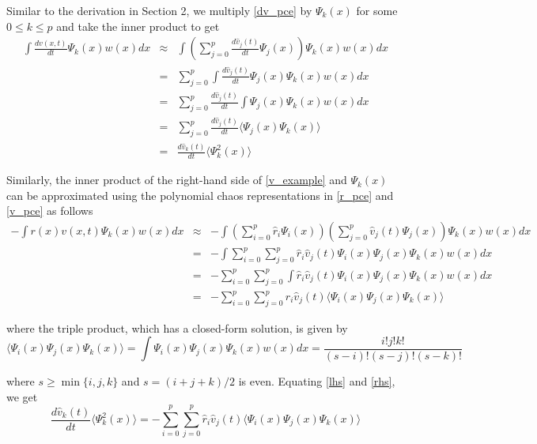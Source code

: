\documentclass[11pt]{article}
\numberwithin{equation}{section}
\begin{document}
Similar to the derivation in Section 2, we multiply \eqref{dv_pce} by $\Psi_k(x)$ for some $0 \leq k \leq  p$ and take the inner product to get
\begin{eqnarray}
\int \frac{dv(x, t)}{dt} \Psi_k(x) w(x) dx & \approx & \int \left( \sum_{j=0}^p \frac{d\hat{v}_j(t)}{dt} \Psi_j(x) \right) \Psi_k(x) w(x) dx  \nonumber \\
& = & \sum_{j=0}^p \int \frac{d\hat{v}_j(t)}{dt} \Psi_j(x) \Psi_k(x) w(x) dx \nonumber \\
& = & \sum_{j=0}^p \frac{d\hat{v}_j(t)}{dt} \int \Psi_j(x) \Psi_k(x) w(x) dx \nonumber \\
& = & \sum_{j=0}^p \frac{d\hat{v}_j(t)}{dt} \langle \Psi_j(x) \Psi_k(x) \rangle \nonumber \\
& = & \frac{d\hat{v}_k(t)}{dt} \langle \Psi_k^2(x) \rangle \label{lhs}
\end{eqnarray}

Similarly, the inner product of the right-hand side of \eqref{v_example} and $\Psi_k(x)$ can be approximated using the polynomial chaos representations in \eqref{r_pce} and \eqref{v_pce} as follows
\begin{eqnarray}
 - \int r(x) v(x, t) \Psi_k(x) w(x) dx & \approx & - \int \left( \sum_{i=0}^p \hat{r}_i \Psi_i(x) \right) \left( \sum_{j=0}^p \hat{v}_j(t) \Psi_j(x) \right) \Psi_k(x) w(x) dx \nonumber \\
& = & - \int \sum_{i=0}^p \sum_{j=0}^p \hat{r}_i \hat{v}_j(t) \Psi_i(x) \Psi_j(x) \Psi_k(x) w(x) dx \nonumber \\
& = & - \sum_{i=0}^p \sum_{j=0}^p \int \hat{r}_i \hat{v}_j(t) \Psi_i(x) \Psi_j(x) \Psi_k(x) w(x) dx \nonumber \\
& = & - \sum_{i=0}^p \sum_{j=0}^p \hat{r}_i \hat{v}_j(t) \langle \Psi_i(x) \Psi_j(x) \Psi_k(x) \rangle \label{rhs}
\end{eqnarray}

where the triple product, which has a closed-form solution, is given by
\begin{equation}
\langle \Psi_i(x) \Psi_j(x) \Psi_k(x) \rangle = \int \Psi_i(x) \Psi_j(x) \Psi_k(x) w(x) dx = \frac{i! j! k!}{(s-i)! (s-j)! (s-k)!}
\end{equation}
 
where $s \geq \min\{i, j, k\}$ and $s = (i + j + k)/2$ is even. Equating \eqref{lhs} and \eqref{rhs}, we get 
\begin{equation*}
\frac{d\hat{v}_k(t)}{dt} \langle \Psi_k^2(x) \rangle = - \sum_{i=0}^p \sum_{j=0}^p \hat{r}_i \hat{v}_j(t) \langle \Psi_i(x) \Psi_j(x) \Psi_k(x) \rangle
\end{equation*}
\end{document}
